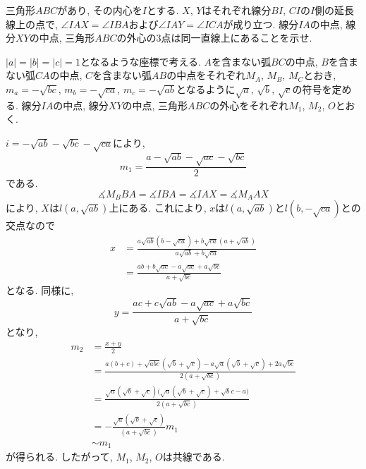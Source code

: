 \begin{bprb}
三角形$ABC$があり, その内心を$I$とする.
$X$, $Y$はそれぞれ線分$BI$, $CI$の$I$側の延長線上の点で, $\angle IAX=\angle IBA$および$\angle IAY=\angle ICA$が成り立つ.
線分$IA$の中点, 線分$XY$の中点, 三角形$ABC$の外心の$3$点は同一直線上にあることを示せ.
\end{bprb}
\begin{ifsol*}
$\lvert a\rvert=\lvert b\rvert=\lvert c\rvert=1$となるような座標で考える.
$A$を含まない弧$BC$の中点, $B$を含まない弧$CA$の中点, $C$を含まない弧$AB$の中点をそれぞれ$M_A$, $M_B$, $M_C$とおき,
$m_a=-\sqrt{bc}$, $m_b=-\sqrt{ca}$, $m_c=-\sqrt{ab}$となるように$\sqrt a$, $\sqrt b$, $\sqrt c$の符号を定める.
線分$IA$の中点, 線分$XY$の中点, 三角形$ABC$の外心をそれぞれ$M_1$, $M_2$, $O$とおく.

$i=-\sqrt{ab}-\sqrt{bc}-\sqrt{ca}$により,
\[m_1=\frac{a-\sqrt{ab}-\sqrt{ac}-\sqrt{bc}}2\]
である.
\[\measuredangle M_BBA=\measuredangle IBA=\measuredangle IAX=\measuredangle M_AAX\]
により, $X$は$l(a,\sqrt{ab})$上にある.
これにより, $x$は$l(a,\sqrt{ab})$と$l(b,-\sqrt{ca})$との交点なので
\begin{align*}
x
&=\frac{a\sqrt{ab}(b-\sqrt{ca})+b\sqrt{ca}(a+\sqrt{ab})}{a\sqrt{ab}+b\sqrt{ca}}\\
&=\frac{ab+b\sqrt{ac}-a\sqrt{ac}+a\sqrt{bc}}{a+\sqrt{bc}}
\end{align*}
となる.
同様に,
\[y=\frac{ac+c\sqrt{ab}-a\sqrt{ac}+a\sqrt{bc}}{a+\sqrt{bc}}\]
となり,
\begin{align*}
m_2
&=\frac{x+y}2\\
&=\frac{a(b+c)+\sqrt{abc}(\sqrt b+\sqrt c)-a\sqrt a(\sqrt b+\sqrt c)+2a\sqrt{bc}}{2(a+\sqrt{bc})}\\
&=\frac{\sqrt a(\sqrt b+\sqrt c)\bigl(\sqrt a(\sqrt b+\sqrt c)+\sqrt bc-a\bigr)}{2(a+\sqrt{bc})}\\
&=-\frac{\sqrt a(\sqrt b+\sqrt c)}{(a+\sqrt{bc})}m_1\\
&\sim m_1
\end{align*}
が得られる.
したがって, $M_1$, $M_2$, $O$は共線である.
\end{ifsol*}